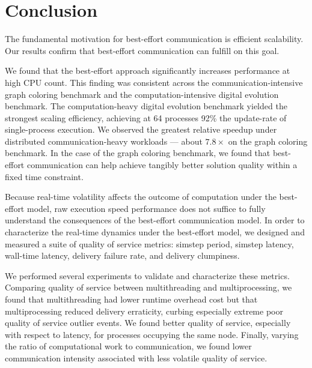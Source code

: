 \section{Conclusion}

The fundamental motivation for best-effort communication is efficient scalability.
Our results confirm that best-effort communication can fulfill on this goal.

We found that the best-effort approach significantly increases performance at high CPU count.
This finding was consistent across the communication-intensive graph coloring benchmark and the computation-intensive digital evolution benchmark.
The computation-heavy digital evolution benchmark yielded the strongest scaling efficiency, achieving at 64 processes 92\% the update-rate of single-process execution.
We observed the greatest relative speedup under distributed communication-heavy workloads --- about $7.8\times$ on the graph coloring benchmark.
In the case of the graph coloring benchmark, we found that best-effort communication can help achieve tangibly better solution quality within a fixed time constraint.

Because real-time volatility affects the outcome of computation under the best-effort model, raw execution speed performance does not suffice to fully understand the consequences of the best-effort communication model.
In order to characterize the real-time dynamics under the best-effort model, we designed and measured a suite of quality of service metrics: simstep period, simstep latency, wall-time latency, delivery failure rate, and delivery clumpiness.

We performed several experiments to validate and characterize these metrics.
Comparing quality of service between multithreading and multiprocessing, we found that multithreading had lower runtime overhead cost but that multiprocessing reduced delivery erraticity, curbing especially extreme poor quality of service outlier events.
We found better quality of service, especially with respect to latency, for processes occupying the same node.
Finally, varying the ratio of computational work to communication, we found lower communication intensity associated with less volatile quality of service.

